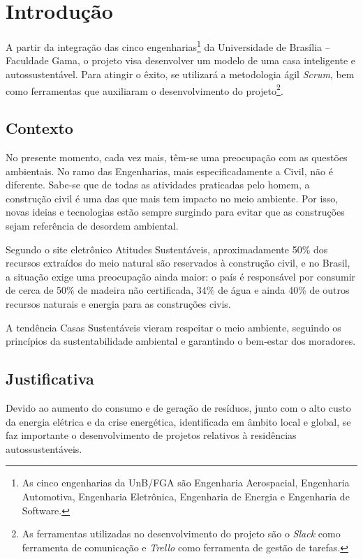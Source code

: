 \chapter[Introdução]{Introdução}

	A partir da integração das cinco engenharias\footnote{As cinco engenharias da UnB/FGA são Engenharia Aerospacial, Engenharia Automotiva, Engenharia Eletrônica, Engenharia de Energia e Engenharia de Software.} da Universidade de Brasília -- Faculdade Gama, o projeto visa desenvolver um modelo de uma casa inteligente e autossustentável. Para atingir o êxito, se utilizará a metodologia ágil \textit{Scrum}, bem como ferramentas que auxiliaram o desenvolvimento do projeto\footnote{As ferramentas utilizadas no desenvolvimento do projeto são o \textit{Slack} como ferramenta de comunicação e \textit{Trello} como ferramenta de gestão de tarefas.}.

\section{Contexto}

	No presente momento, cada vez mais, têm-se uma preocupação com as questões ambientais. No ramo das Engenharias, mais especificadamente a Civil, não é diferente. Sabe-se que de todas as atividades praticadas pelo homem, a construção civil é uma das que mais tem impacto no meio ambiente. Por isso, novas ideias e tecnologias estão sempre surgindo para evitar que as construções sejam referência de desordem ambiental\cite{2009Fiuza}.

	Segundo o site eletrônico Atitudes Sustentáveis, aproximadamente 50\% dos recursos extraídos do meio natural são reservados à construção civil, e no Brasil, a situação exige uma preocupação ainda maior: o país é responsável por consumir de cerca de 50\% de madeira não certificada, 34\% de água e ainda 40\% de outros recursos naturais e energia para as construções civis\cite{2014Sustentaveis}.

	A tendência Casas Sustentáveis vieram respeitar o meio ambiente, seguindo os princípios da sustentabilidade ambiental e garantindo o bem-estar dos moradores.


\section{Justificativa}

	Devido ao aumento do consumo e de geração de resíduos, junto com o alto custo da energia elétrica e da crise energética, identificada em âmbito local e global, se faz importante o desenvolvimento de projetos relativos à residências autossustentáveis.

